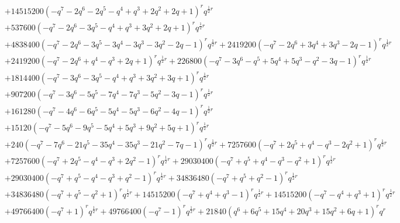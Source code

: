 \documentclass[11pt,english]{amsart}
\numberwithin{equation}{section}
\numberwithin{figure}{section}
\theoremstyle{plain}
\theoremstyle{plain}
\theoremstyle{definition}
\theoremstyle{remark}
\begin{document}
{\begin{align*}
& + 14515200  {\left(-q^{7} - 2  q^{6} - 2  q^{5} - q^{4} + q^{3} + 2  q^{2} + 2  q + 1\right)}^{r} q^{\frac{1}{2}  r} \\
& + 537600  {\left(-q^{7} - 2  q^{6} - 3  q^{5} - q^{4} + q^{3} + 3  q^{2} + 2  q + 1\right)}^{r} q^{\frac{1}{2}  r} \\
& + 4838400  {\left(-q^{7} - 2  q^{6} - 3  q^{5} - 3  q^{4} - 3  q^{3} - 3  q^{2} - 2  q - 1\right)}^{r} q^{\frac{1}{2}  r} + 2419200  {\left(-q^{7} - 2  q^{6} + 3  q^{4} + 3  q^{3} - 2  q - 1\right)}^{r} q^{\frac{1}{2}  r} \\
& + 2419200  {\left(-q^{7} - 2  q^{6} + q^{4} - q^{3} + 2  q + 1\right)}^{r} q^{\frac{1}{2}  r} + 226800  {\left(-q^{7} - 3  q^{6} - q^{5} + 5  q^{4} + 5  q^{3} - q^{2} - 3  q - 1\right)}^{r} q^{\frac{1}{2}  r} \\
& + 1814400  {\left(-q^{7} - 3  q^{6} - 3  q^{5} - q^{4} + q^{3} + 3  q^{2} + 3  q + 1\right)}^{r} q^{\frac{1}{2}  r} \\
& + 907200  {\left(-q^{7} - 3  q^{6} - 5  q^{5} - 7  q^{4} - 7  q^{3} - 5  q^{2} - 3  q - 1\right)}^{r} q^{\frac{1}{2}  r} \\
& + 161280  {\left(-q^{7} - 4  q^{6} - 6  q^{5} - 5  q^{4} - 5  q^{3} - 6  q^{2} - 4  q - 1\right)}^{r} q^{\frac{1}{2}  r} \\
& + 15120  {\left(-q^{7} - 5  q^{6} - 9  q^{5} - 5  q^{4} + 5  q^{3} + 9  q^{2} + 5  q + 1\right)}^{r} q^{\frac{1}{2}  r} \\
& + 240  {\left(-q^{7} - 7  q^{6} - 21  q^{5} - 35  q^{4} - 35  q^{3} - 21  q^{2} - 7  q - 1\right)}^{r} q^{\frac{1}{2}  r} + 7257600  {\left(-q^{7} + 2  q^{5} + q^{4} - q^{3} - 2  q^{2} + 1\right)}^{r} q^{\frac{1}{2}  r} \\
& + 7257600  {\left(-q^{7} + 2  q^{5} - q^{4} - q^{3} + 2  q^{2} - 1\right)}^{r} q^{\frac{1}{2}  r} + 29030400  {\left(-q^{7} + q^{5} + q^{4} - q^{3} - q^{2} + 1\right)}^{r} q^{\frac{1}{2}  r} \\
& + 29030400  {\left(-q^{7} + q^{5} - q^{4} - q^{3} + q^{2} - 1\right)}^{r} q^{\frac{1}{2}  r} + 34836480  {\left(-q^{7} + q^{5} + q^{2} - 1\right)}^{r} q^{\frac{1}{2}  r} \\
& + 34836480  {\left(-q^{7} + q^{5} - q^{2} + 1\right)}^{r} q^{\frac{1}{2}  r} + 14515200  {\left(-q^{7} + q^{4} + q^{3} - 1\right)}^{r} q^{\frac{1}{2}  r} + 14515200  {\left(-q^{7} - q^{4} + q^{3} + 1\right)}^{r} q^{\frac{1}{2}  r} \\
& + 49766400  {\left(-q^{7} + 1\right)}^{r} q^{\frac{1}{2}  r} + 49766400  {\left(-q^{7} - 1\right)}^{r} q^{\frac{1}{2}  r} + 21840  {\left(q^{6} + 6  q^{5} + 15  q^{4} + 20  q^{3} + 15  q^{2} + 6  q + 1\right)}^{r} q^{r} \\

\end{align*}}
\end{document}
